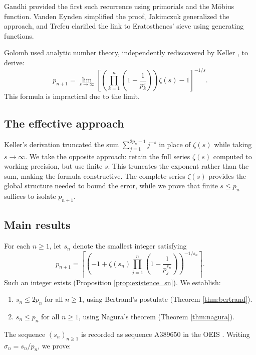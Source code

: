 \documentclass[12pt]{article}
\theoremstyle{plain}
\theoremstyle{definition}
\theoremstyle{remark}
\begin{document}
Gandhi \cite{Gandhi1971} provided the first such recurrence using primorials and the Möbius function. Vanden Eynden \cite{VandenEynden1972} simplified the proof, Jakimczuk \cite{Jakimczuk2024} generalized the approach, and Trefeu \cite{Trefeu2025} clarified the link to Eratosthenes' sieve using generating functions.

Golomb \cite{Golomb1976} used analytic number theory, independently rediscovered by Keller \cite{Keller2007}, to derive:
\[
p_{n+1} = \lim_{s\to\infty} \left[\left(\prod_{k=1}^n \left(1-\frac{1}{p_k^s}\right)\right)\zeta(s)-1\right]^{-1/s}.
\]
This formula is impractical due to the limit.

\subsection{The effective approach}

Keller's derivation truncated the sum $\sum_{j=1}^{2p_n-1} j^{-s}$ in place of $\zeta(s)$ while taking $s \to \infty$. We take the opposite approach: retain the full series $\zeta(s)$ computed to working precision, but use finite $s$. This truncates the exponent rather than the sum, making the formula constructive. The complete series $\zeta(s)$ provides the global structure needed to bound the error, while we prove that finite $s \leq p_n$ suffices to isolate $p_{n+1}$.

\subsection{Main results}

For each $n \geq 1$, let $s_n$ denote the smallest integer satisfying
\[
p_{n+1} = \left\lceil \left( -1 + \zeta(s_n) \prod_{j=1}^{n} \left(1 - \frac{1}{p_j^{s_n}}\right) \right)^{-1/s_n} \right\rceil.
\]
Such an integer exists (Proposition \ref{prop:existence_sn}). We establish:

\begin{enumerate}
\item $s_n \leq 2p_n$ for all $n \geq 1$, using Bertrand's postulate (Theorem \ref{thm:bertrand}).
\item $s_n \leq p_n$ for all $n \geq 1$, using Nagura's theorem (Theorem \ref{thm:nagura}).
\end{enumerate}

The sequence $(s_n)_{n \geq 1}$ is recorded as sequence A389650 in the OEIS \cite{OEIS}. Writing $\sigma_n = s_n/p_n$, we prove:
\end{document}
